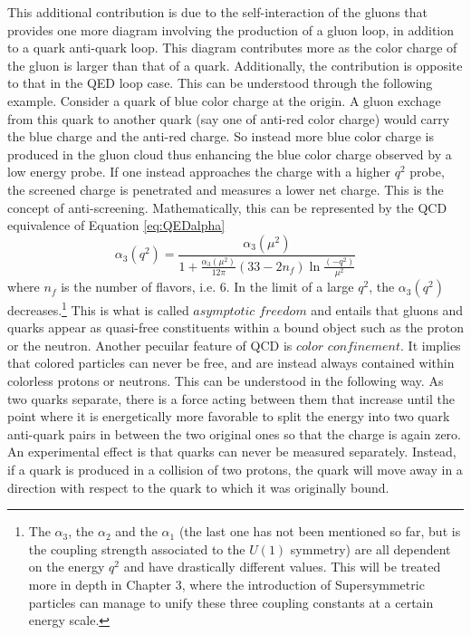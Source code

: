 This additional contribution is due to the self-interaction of the gluons that provides one more diagram involving the production of a gluon loop, in addition to a quark anti-quark loop. 
This diagram contributes more as the color charge of the gluon is larger than that of a quark. 
Additionally, the contribution is opposite to that in the QED loop case. 
This can be understood through the following example. Consider a quark of blue color charge at the origin. 
A gluon exchage from this quark to another quark (say one of anti-red color charge) would carry the blue charge and the anti-red charge. 
So instead more blue color charge is produced in the gluon cloud thus enhancing the blue color charge observed by a low energy probe. 
If one instead approaches the charge with a higher $q^{2}$ probe, the screened charge is penetrated and measures a lower net charge.
This is the concept of anti-screening.
Mathematically, this can be represented by the QCD equivalence of Equation \ref{eq:QEDalpha} 
\begin{equation}
\alpha_{3}(q^{2})=\frac{\alpha_{3}(\mu^{2})}{1+\frac{\alpha_{3}(\mu^{2})}{12\pi}(33-2 n_{f})\ln\frac{(-q^{2})}{\mu^{2}}}
\end{equation}
where $n_{f}$ is the number of flavors, i.e. 6. 
In the limit of a large $q^{2}$, the $\alpha_{3}(q^{2})$ decreases.\footnote{The $\alpha_{3}$, the $\alpha_{2}$ and the $\alpha_{1}$ (the last one has not been mentioned so far, but is the coupling strength associated to the $U(1)$ symmetry) are all dependent on the energy $q^{2}$ and have drastically different values. This will be treated more in depth in Chapter 3, where the introduction of Supersymmetric particles can manage to unify these three coupling constants at a certain energy scale.} 
This is what is called $asymptotic$ $freedom$ \cite{Gross:1973id,Politzer:1973fx} and entails that gluons and quarks appear as quasi-free constituents within a bound object such as the proton or the neutron. 
\newpara
\noindent\justify
Another pecuilar feature of QCD is $color$ $confinement$. It implies that colored particles can never be free, and are instead always contained within colorless protons or neutrons.  
This can be understood in the following way. As two quarks separate, there is a force acting between them that increase until the point where it is energetically more favorable to split the energy into two quark anti-quark pairs in between the two original ones so that the charge is again zero.
An experimental effect is that quarks can never be measured separately. 
Instead, if a quark is produced in a collision of two protons, the quark will move away in a direction with respect to the quark to which it was originally bound. 
